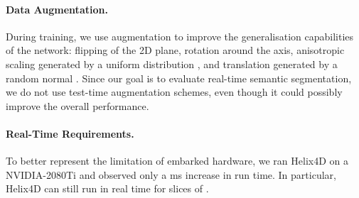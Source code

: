 \documentclass[runningheads]{tpls/llncs}
\begin{document}
\paragraph{Data Augmentation.} During training, we use augmentation to improve the generalisation capabilities of the network: flipping of the  2D plane, rotation around the  axis, anisotropic scaling generated by a uniform distribution , and translation generated by a random normal . Since our goal is to evaluate real-time semantic segmentation, we do not use test-time augmentation schemes, even though it could possibly improve the overall performance.

\paragraph{Real-Time Requirements.} To better represent the limitation of embarked hardware, we ran Helix4D on a NVIDIA-2080Ti and observed only a ms increase in run time. In particular, Helix4D can still run in real time for slices of .
\end{document}
